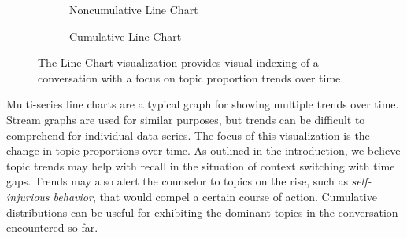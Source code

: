 \begin{figure}[h]
  \centering
    \begin{subfigure}[h]{0.75\textwidth}
      \caption{Noncumulative Line Chart}
      \label{linechart}
      \vspace{3mm}
    \end{subfigure}
    \begin{subfigure}[h]{0.75\textwidth}
      \caption{Cumulative Line Chart}
      \label{linechartcumulative}
    \end{subfigure}
  \caption{The Line Chart visualization provides visual indexing of a conversation
  with a focus on topic proportion trends over time.}
\end{figure}

Multi-series line charts are a typical graph for showing multiple trends over time.
Stream graphs are used for similar purposes, but trends can be difficult to comprehend
for individual data series. The focus of this visualization is the change in topic
proportions over time. As outlined in the introduction, we believe topic trends may
help with recall in the situation of context switching with time gaps. Trends may
also alert the counselor to topics on the rise, such as \textit{self-injurious behavior}, that
would compel a certain course of action. Cumulative distributions can be useful for
exhibiting the dominant topics in the conversation encountered so far.

